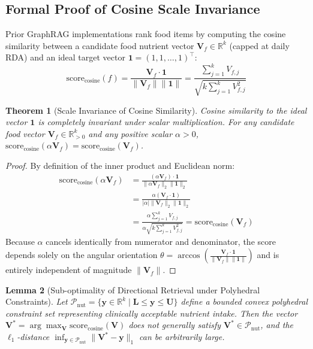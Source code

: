 \documentclass[5p,times,twocolumn]{elsarticle}
\newtheorem{theorem}{Theorem}
\newtheorem{lemma}[theorem]{Lemma}
\begin{document}
\subsection{Formal Proof of Cosine Scale Invariance}
\label{sec:proof_cosine}
Prior GraphRAG implementations rank food items by computing the cosine similarity between a candidate food nutrient vector $\mathbf{V}_f \in \mathbb{R}^k$ (capped at daily RDA) and an ideal target vector $\mathbf{1} = (1, 1, \ldots, 1)^\top$:
\begin{equation}
\text{score}_{\text{cosine}}(f) = \frac{\mathbf{V}_f \cdot \mathbf{1}}{\|\mathbf{V}_f\| \|\mathbf{1}\|} = \frac{\sum_{j=1}^k V_{f,j}}{\sqrt{k \sum_{j=1}^k V_{f,j}^2}}
\end{equation}

\begin{theorem}[Scale Invariance of Cosine Similarity]
Cosine similarity to the ideal vector $\mathbf{1}$ is completely invariant under scalar multiplication. For any candidate food vector $\mathbf{V}_f \in \mathbb{R}_{>0}^k$ and any positive scalar $\alpha > 0$, $\text{score}_{\text{cosine}}(\alpha \mathbf{V}_f) = \text{score}_{\text{cosine}}(\mathbf{V}_f)$.
\end{theorem}

\begin{proof}
By definition of the inner product and Euclidean norm:
\begin{align}
\text{score}_{\text{cosine}}(\alpha \mathbf{V}_f) 
&= \frac{(\alpha \mathbf{V}_f) \cdot \mathbf{1}}{\|\alpha \mathbf{V}_f\|_2 \|\mathbf{1}\|_2} \nonumber \\
&= \frac{\alpha (\mathbf{V}_f \cdot \mathbf{1})}{|\alpha| \|\mathbf{V}_f\|_2 \|\mathbf{1}\|_2} \nonumber \\
&= \frac{\alpha \sum_{j=1}^k V_{f,j}}{\alpha \sqrt{k \sum_{j=1}^k V_{f,j}^2}} = \text{score}_{\text{cosine}}(\mathbf{V}_f)
\end{align}
Because $\alpha$ cancels identically from numerator and denominator, the score depends solely on the angular orientation $\theta = \arccos(\frac{\mathbf{V}_f \cdot \mathbf{1}}{\|\mathbf{V}_f\| \|\mathbf{1}\|})$ and is entirely independent of magnitude $\|\mathbf{V}_f\|$.
\end{proof}

\begin{lemma}[Sub-optimality of Directional Retrieval under Polyhedral Constraints]
Let $\mathcal{P}_{\text{nut}} = \{\mathbf{y} \in \mathbb{R}^k \mid \mathbf{L} \le \mathbf{y} \le \mathbf{U}\}$ define a bounded convex polyhedral constraint set representing clinically acceptable nutrient intake. Then the vector $\mathbf{V}^* = \arg\max_{\mathbf{V}} \text{score}_{\text{cosine}}(\mathbf{V})$ does not generally satisfy $\mathbf{V}^* \in \mathcal{P}_{\text{nut}}$, and the $\ell_1$-distance $\inf_{\mathbf{y} \in \mathcal{P}_{\text{nut}}} \|\mathbf{V}^* - \mathbf{y}\|_1$ can be arbitrarily large.
\end{lemma}
\end{document}
